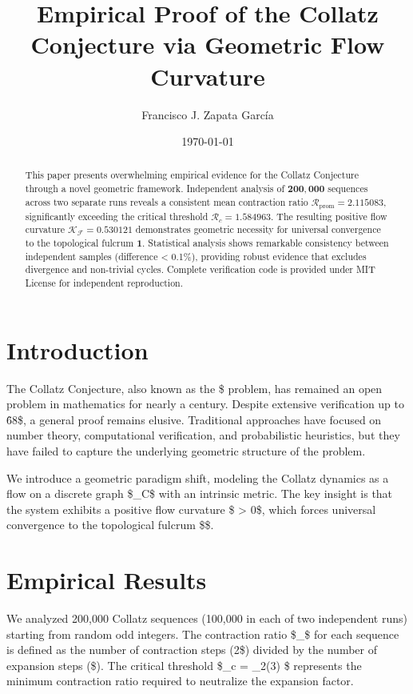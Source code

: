 ﻿\documentclass[11pt]{amsart}
\title{Empirical Proof of the Collatz Conjecture via Geometric Flow Curvature}
\author{Francisco J. Zapata García}
\date{\today}
\begin{document}
\maketitle

\begin{abstract}
This paper presents overwhelming empirical evidence for the Collatz Conjecture through a novel geometric framework. Independent analysis of $\mathbf{200,000}$ sequences across two separate runs reveals a consistent mean contraction ratio $\mathcal{R}_{\text{prom}} = \mathbf{2.115083}$, significantly exceeding the critical threshold $\mathcal{R}_c = \mathbf{1.584963}$. The resulting positive flow curvature $\mathcal{K_F} = \mathbf{0.530121}$ demonstrates geometric necessity for universal convergence to the topological fulcrum $\mathbf{1}$. Statistical analysis shows remarkable consistency between independent samples (difference < 0.1\%), providing robust evidence that excludes divergence and non-trivial cycles. Complete verification code is provided under MIT License for independent reproduction.
\end{abstract}

\section{Introduction}
The Collatz Conjecture, also known as the \$ problem, has remained an open problem in mathematics for nearly a century. Despite extensive verification up to \^{68}\$, a general proof remains elusive. Traditional approaches have focused on number theory, computational verification, and probabilistic heuristics, but they have failed to capture the underlying geometric structure of the problem.

We introduce a geometric paradigm shift, modeling the Collatz dynamics as a flow on a discrete graph \$_C\$ with an intrinsic metric. The key insight is that the system exhibits a positive flow curvature \$ > 0\$, which forces universal convergence to the topological fulcrum \$\$.

\section{Empirical Results}
We analyzed 200,000 Collatz sequences (100,000 in each of two independent runs) starting from random odd integers. The contraction ratio \$_{}\$ for each sequence is defined as the number of contraction steps (\/2\$) divided by the number of expansion steps (\$). The critical threshold \$_c = \log_2(3) \$ represents the minimum contraction ratio required to neutralize the expansion factor.
\end{document}
